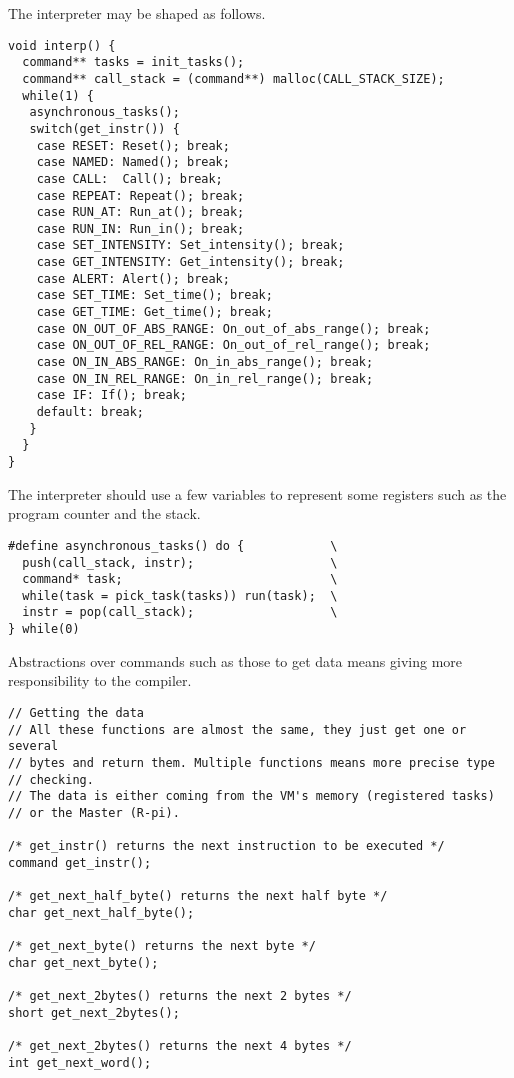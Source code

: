 \documentclass[12pt,twoside,a4paper]{article}
\begin{document}
The interpreter may be shaped as follows.
\begin{lstlisting}
void interp() {
  command** tasks = init_tasks();
  command** call_stack = (command**) malloc(CALL_STACK_SIZE);
  while(1) {
   asynchronous_tasks();
   switch(get_instr()) {
    case RESET: Reset(); break;
    case NAMED: Named(); break;
    case CALL:  Call(); break;
    case REPEAT: Repeat(); break;
    case RUN_AT: Run_at(); break;
    case RUN_IN: Run_in(); break;
    case SET_INTENSITY: Set_intensity(); break;
    case GET_INTENSITY: Get_intensity(); break;
    case ALERT: Alert(); break;
    case SET_TIME: Set_time(); break;
    case GET_TIME: Get_time(); break;
    case ON_OUT_OF_ABS_RANGE: On_out_of_abs_range(); break;
    case ON_OUT_OF_REL_RANGE: On_out_of_rel_range(); break;
    case ON_IN_ABS_RANGE: On_in_abs_range(); break;
    case ON_IN_REL_RANGE: On_in_rel_range(); break;
    case IF: If(); break;
    default: break;
   }
  }
}
\end{lstlisting}

The interpreter should use a few variables to represent 
some registers such as the program counter and the stack.

\begin{lstlisting}
#define asynchronous_tasks() do {            \
  push(call_stack, instr);                   \
  command* task;                             \
  while(task = pick_task(tasks)) run(task);  \
  instr = pop(call_stack);                   \
} while(0)
\end{lstlisting}

Abstractions over commands such as those to get data means giving more
responsibility to the compiler.

\begin{lstlisting}
// Getting the data
// All these functions are almost the same, they just get one or several
// bytes and return them. Multiple functions means more precise type
// checking.
// The data is either coming from the VM's memory (registered tasks)
// or the Master (R-pi).

/* get_instr() returns the next instruction to be executed */
command get_instr();

/* get_next_half_byte() returns the next half byte */
char get_next_half_byte();

/* get_next_byte() returns the next byte */
char get_next_byte();

/* get_next_2bytes() returns the next 2 bytes */
short get_next_2bytes();

/* get_next_2bytes() returns the next 4 bytes */
int get_next_word();
\end{lstlisting}
\end{document}
